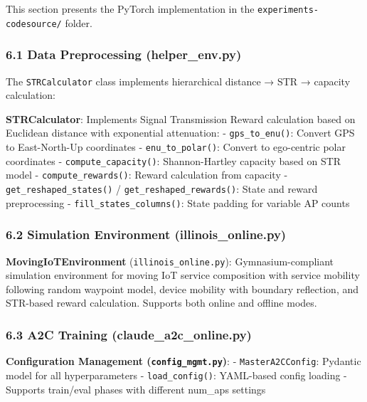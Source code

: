 \documentclass[
  10pt,
  twocolumn,
]{article}
\begin{document}
This section presents the PyTorch implementation in the
\texttt{experiments-codesource/} folder.

\hypertarget{data-preprocessing-helper_env.py}{%
	\subsubsection{6.1 Data Preprocessing
		(helper\_env.py)}\label{data-preprocessing-helper_env.py}}

The \texttt{STRCalculator} class implements hierarchical distance → STR
→ capacity calculation:

\textbf{STRCalculator}: Implements Signal Transmission Reward
calculation based on Euclidean distance with exponential attenuation: -
\texttt{gps\_to\_enu()}: Convert GPS to East-North-Up coordinates -
\texttt{enu\_to\_polar()}: Convert to ego-centric polar coordinates -
\texttt{compute\_capacity()}: Shannon-Hartley capacity based on STR
model - \texttt{compute\_rewards()}: Reward calculation from capacity -
\texttt{get\_reshaped\_states()} / \texttt{get\_reshaped\_rewards()}:
State and reward preprocessing - \texttt{fill\_states\_columns()}: State
padding for variable AP counts

\hypertarget{simulation-environment-illinois_online.py}{%
	\subsubsection{6.2 Simulation Environment
		(illinois\_online.py)}\label{simulation-environment-illinois_online.py}}

\textbf{MovingIoTEnvironment} (\texttt{illinois\_online.py}):
Gymnasium-compliant simulation environment for moving IoT service
composition with service mobility following random waypoint model,
device mobility with boundary reflection, and STR-based reward
calculation. Supports both online and offline modes.

\hypertarget{a2c-training-claude_a2c_online.py}{%
	\subsubsection{6.3 A2C Training
		(claude\_a2c\_online.py)}\label{a2c-training-claude_a2c_online.py}}

\textbf{Configuration Management (\texttt{config\_mgmt.py})}: -
\texttt{MasterA2CConfig}: Pydantic model for all hyperparameters -
\texttt{load\_config()}: YAML-based config loading - Supports train/eval
phases with different num\_aps settings
\end{document}
